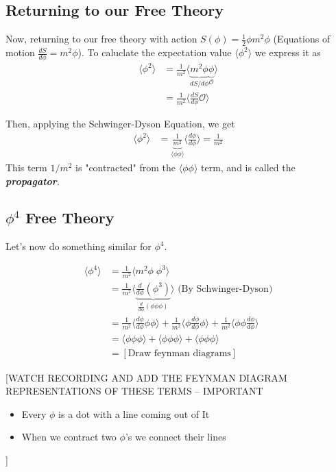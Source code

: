 \documentclass{article}
\newcommand{\mean}[1]{\langle #1 \rangle}
\begin{document}
\vskip 1cm
\subsection{Returning to our Free Theory}
\vskip 0.5cm
Now, returning to our free theory with action $S(\phi) = \frac{1}{2}\phi m^2 \phi$ (Equations of motion $\frac{dS}{d\phi} = m^2 \phi$). To caluclate the expectation value  $\mean{\phi^2}$ we express it as 
\begin{align*}
  \mean{\phi^2} &= \frac{1}{m^2} \mean{\underbrace{m^2 \phi}_{dS/d\phi} \underbrace{\phi}_{\mathcal{O}}} \\
  &= \frac{1}{m^2} \mean{ \frac{dS}{d\phi} \mathcal{O}}
\end{align*}

Then, applying the Schwinger-Dyson Equation, we get 
\begin{align*}
  \mean{\phi^2} &= \underbrace{\frac{1}{m^2}}_{\mean{\phi \phi}} \mean{\frac{d\phi}{d\phi}} = \frac{1}{m^2}
\end{align*}
This term $1/m^2$ is "contracted" from the $\mean{\phi \phi}$ term, and is called the \emph{\textbf{propagator}}.

\vskip 1cm
\subsection{$\phi^4$ Free Theory}

Let's now do something similar for $\phi^4$.

\begin{align*}
  \mean{\phi^4} &= \frac{1}{m^2} \mean{m^2 \phi \; \phi^3} \\
  &= \frac{1}{m^2} \mean{\underbrace{\frac{d}{d\phi}(\phi^3)}_{\frac{d}{d\phi}(\phi \phi \phi)}} \text{  (By Schwinger-Dyson)} \\
  &= \frac{1}{m^2} \mean{\frac{d\phi}{d\phi} \phi \phi} + \frac{1}{m^2} \mean{\phi \frac{d\phi}{d\phi} \phi}  +\frac{1}{m^2} \mean{\phi \phi\frac{d\phi}{d\phi}} \\
  &= \mean{\phi \phi \phi} + \mean{\phi \phi \phi} + \mean{\phi \phi \phi} \\
  &= [\text{Draw feynman diagrams}]
\end{align*}


[WATCH RECORDING AND ADD THE FEYNMAN DIAGRAM REPRESENTATIONS OF THESE TERMS -- IMPORTANT
\begin{itemize}
  \item Every $\phi$ is a dot with a line coming out of It
  \item When we contract two $\phi$'s we connect their lines
\end{itemize}
]
\end{document}
